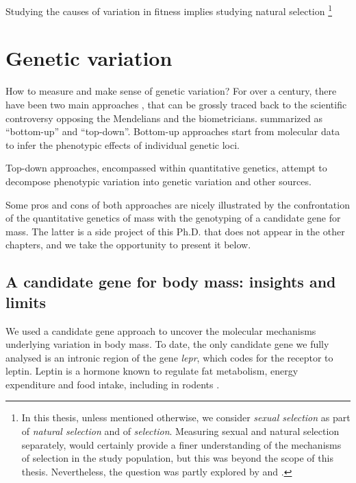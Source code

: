 Studying the causes of variation in fitness implies studying natural selection \footnote{In this thesis, unless mentioned otherwise, we consider \emph{sexual selection} as part of \emph{natural selection} and of \emph{selection}. Measuring sexual and natural selection separately, would certainly provide a finer understanding of the mechanisms of selection in the study population, but this was beyond the scope of this thesis. Nevertheless, the question was partly explored by \cite{Garcia-Navas2016} and \cite{Garcia-Navas2015a}.}

\section{Genetic variation}

How to measure and make sense of genetic variation?
For over a century, there have been two main approaches \parencite{Liedvogel2011}, that can be grossly traced back to the scientific controversy opposing the Mendelians and the biometricians.
summarized as ``bottom-up'' and ``top-down''.
Bottom-up approaches start from molecular data to infer the phenotypic effects of individual genetic loci. 


Top-down approaches, encompassed within quantitative genetics, attempt to decompose phenotypic variation into genetic variation and other sources. 


Some pros and cons of both approaches are nicely illustrated by the confrontation of the quantitative genetics of mass with the genotyping of a candidate gene for mass. The latter is a side project of this Ph.D. that does not appear in the other chapters, and we take the opportunity to present it below.

\subsection{A candidate gene for body mass: insights and limits}

We used a candidate gene approach \parencite{Fitzpatrick2005} to uncover the molecular mechanisms underlying variation in body mass. To date, the only candidate gene we fully analysed is an intronic region of the gene \emph{lepr}, which codes for the receptor to leptin. Leptin is a hormone known to regulate fat metabolism, energy expenditure and food intake, including in rodents \parencite{Houseknecht1998}.

